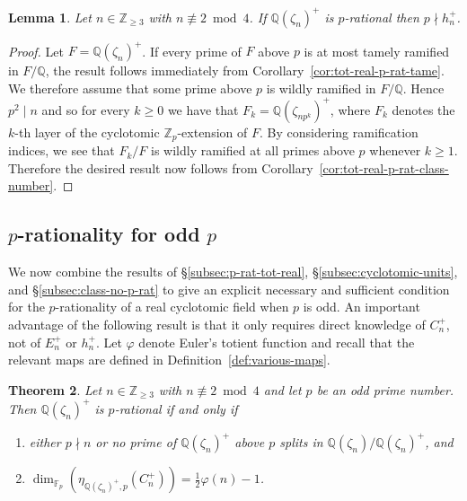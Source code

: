 \documentclass[12pt, a4paper, usenames]{amsart}
\newcommand{\Z}{\mathbb{Z}}
\newcommand{\Q}{\mathbb{Q}}
\newcommand{\F}{\mathbb{F}}
\theoremstyle{plain}
\newtheorem{theorem}{Theorem}[section]
\newtheorem{lemma}[theorem]{Lemma}
\theoremstyle{remark}
\theoremstyle{definition}
\begin{document}
\begin{lemma}\label{lem:real-cyclo-p-rat-class-number}
Let $n \in \Z_{\geq 3}$ with $n \not \equiv 2 \bmod 4$.
If $\Q(\zeta_{n})^{+}$ is $p$-rational then $p \nmid h_{n}^{+}$.
\end{lemma}

\begin{proof}
Let $F=\Q(\zeta_{n})^{+}$.
If every prime of $F$ above $p$ is at most tamely ramified in $F/\Q$, the result follows immediately from Corollary~\ref{cor:tot-real-p-rat-tame}. 
We therefore assume that some prime above $p$ is wildly ramified in $F/\Q$.
Hence $p^{2} \mid n$ and so for every $k \geq 0$ we have that $F_{k} = \Q(\zeta_{np^{k}})^{+}$,
where $F_{k}$ denotes the $k$-th layer of the cyclotomic $\Z_{p}$-extension of $F$.
By considering ramification indices, we see that $F_{k}/F$ is wildly ramified at all primes above $p$
whenever $k \geq 1$. Therefore the desired result now follows from 
Corollary~\ref{cor:tot-real-p-rat-class-number}.
\end{proof}


\subsection{$p$-rationality for odd $p$}\label{subsec:real-cyclo-p-odd-rat}
We now combine the results of \S \ref{subsec:p-rat-tot-real}, 
\S \ref{subsec:cyclotomic-units}, and \S \ref{subsec:class-no-p-rat}
to give an explicit necessary and sufficient condition for the $p$-rationality of a real cyclotomic field when $p$ is odd. An important advantage of the following result
is that it only requires direct knowledge of $C_{n}^{+}$, 
not of $E_{n}^{+}$ or $h_{n}^{+}$.
Let $\varphi$ denote Euler's totient function
and recall that the relevant maps are defined in Definition~\ref{def:various-maps}.

\begin{theorem}\label{thm:p-odd-rat-cyclo}
Let $n \in \Z_{\geq 3}$ with $n \not \equiv 2 \bmod 4$ and let $p$ be an odd prime number.
Then $\Q(\zeta_{n})^{+}$ is $p$-rational if and only if
\begin{enumerate}
    \item either $p \nmid n$ or no prime of $\Q(\zeta_{n})^{+}$ above $p$ splits in $\Q(\zeta_{n})/\Q(\zeta_{n})^{+}$, and
    \item $\dim_{\F_{p}}(\eta_{\Q(\zeta_{n})^{+},p}(C_{n}^{+}))=\frac{1}{2}\varphi(n)-1$.
\end{enumerate}
\end{theorem}
\end{document}
